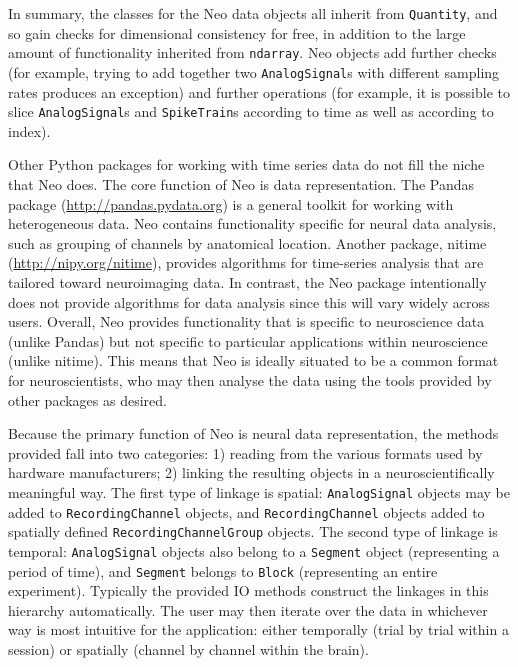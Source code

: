 \documentclass{frontiers}
\begin{document}
In summary, the classes for the Neo data objects all inherit from \lstinline`Quantity`, and so gain checks for dimensional consistency for free, in addition to the large amount of functionality inherited from \lstinline`ndarray`.
Neo objects add further checks (for example, trying to add together two \lstinline`AnalogSignal`s with different sampling rates produces an exception) and further operations (for example, it is possible to slice \lstinline`AnalogSignal`s and \lstinline`SpikeTrain`s according to time as well as according to index).

Other Python packages for working with time series data do not fill the niche that Neo does. 
The core function of Neo is data representation. 
The Pandas package (\url{http://pandas.pydata.org}) is a general toolkit for working with heterogeneous data. 
Neo contains functionality specific for neural data analysis, such as grouping of channels by anatomical location.
Another package, nitime (\url{http://nipy.org/nitime}), provides algorithms for time-series analysis that are tailored toward neuroimaging data.
In contrast, the Neo package intentionally does not provide algorithms for data analysis since this will vary widely across users.
Overall, Neo provides functionality that is specific to neuroscience data (unlike Pandas) but not specific to particular applications within neuroscience (unlike nitime).
This means that Neo is ideally situated to be a common format for neuroscientists, who may then analyse the data using the tools provided by other packages as desired.

Because the primary function of Neo is neural data representation, the methods provided fall into two categories: 1) reading from the various formats used by hardware manufacturers; 2) linking the resulting objects in a neuroscientifically meaningful way.
The first type of linkage is spatial: \lstinline`AnalogSignal` objects may be added to \lstinline`RecordingChannel` objects, and \lstinline`RecordingChannel` objects added to spatially defined \lstinline`RecordingChannelGroup` objects.
The second type of linkage is temporal: \lstinline`AnalogSignal` objects also belong to a \lstinline`Segment` object (representing a period of time), and \lstinline`Segment` belongs to \lstinline`Block` (representing an entire experiment).
Typically the provided IO methods construct the linkages in this hierarchy automatically.
The user may then iterate over the data in whichever way is most intuitive for the application: either temporally (trial by trial within a session) or spatially (channel by channel within the brain).
\end{document}
